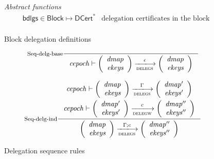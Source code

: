 \documentclass[11pt,a4paper]{article}
\newcommand{\var}[1]{\mathit{#1}}
\newcommand{\fun}[1]{\mathsf{#1}}
\newcommand{\type}[1]{\mathsf{#1}}
\newcommand{\trans}[2]{\xlongrightarrow[\textsc{#1}]{#2}}
\newcommand{\seqof}[1]{#1^{*}}
\newcommand{\DCert}{\type{DCert}}
\newcommand{\Block}{\type{Block}}
\begin{document}
\begin{figure}
  \emph{Abstract functions}
  \begin{align*}
    & \fun{bdlgs} \in \Block \mapsto \seqof{\DCert} & \text{delegation certificates in the block}\\
  \end{align*}
  \caption{Block delegation definitions}
  \label{fig:block-delegation-defs}
\end{figure}

\begin{figure}
  \centering
  \begin{equation}
    \inference[Seq-delg-base]
    {}
    { \var{cepoch} \vdash \left(
        \begin{array}{r}
          \var{dmap}\\
          \var{ekeys}
        \end{array}
      \right)
        \trans{delegs}{\epsilon}
      \left(
        \begin{array}{r}
          \var{dmap}\\
          \var{ekeys}
        \end{array}
      \right)
    }
    \label{eq:rule:sequence-delegation-base}
  \end{equation}

  \begin{equation}
    \inference[Seq-delg-ind]
    { \var{cepoch} \vdash
      {\left(
        \begin{array}{r}
          \var{dmap}\\
          \var{ekeys}
        \end{array}
      \right)}
      \trans{delegs}{\Gamma}
      {\left(
        \begin{array}{r}
          \var{dmap'}\\
          \var{ekeys'}
        \end{array}
      \right)}
    \\ ~ \\
    \var{cepoch} \vdash
    {\left(
        \begin{array}{r}
          \var{dmap'}\\
          \var{ekeys'}
        \end{array}
      \right)}
      \trans{delegw}{c}
      {\left(
        \begin{array}{r}
          \var{dmap''}\\
          \var{ekeys''}
        \end{array}
      \right)}
    }
    { \left(
        \begin{array}{r}
          \var{dmap}\\
          \var{ekeys}
        \end{array}
      \right)
      \trans{delegs}{\Gamma; c}
      \left(
        \begin{array}{r}
          \var{dmap''}\\
          \var{ekeys''}
        \end{array}
      \right)
    }
    \label{eq:rule:sequence-delegation-inductive}
  \end{equation}
  \caption{Delegation sequence rules}
  \label{fig:delegation-sequence-rules}
\end{figure}
\end{document}
